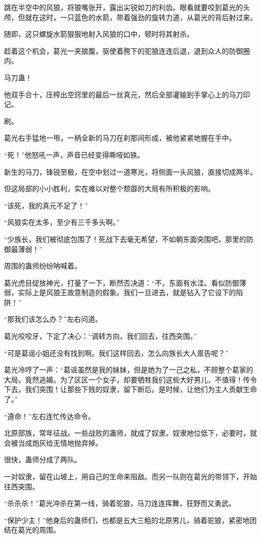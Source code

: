 \begin{this_body}
跳在半空中的风狼，将狼嘴张开，露出尖锐如刀的利齿。眼看就要咬到葛光的头颅，但就在这时，一只蓝色的水箭，带着强劲的旋转力道，从葛光的背后射过来。

随即，这只螺旋水箭狠狠地射入风狼的口中，顿时将其射杀。

趁着这个机会，葛光一夹狼腹，驱使着胯下的驼狼连连后退，退到众人的防御圈内。

马刀蛊！

他双手合十，压榨出空窍里的最后一丝真元，然后全部灌输到手掌心上的马刀印记。

刷。

葛光右手猛地一甩，一柄全新的马刀在刹那间形成，被他紧紧地握在手中。

“死！”他怒吼一声，声音已经变得嘶哑如铁。

新生的马刀，锋锐至极，在空中划过一道寒光，将侧面一头风狼，直接切成两半。

但这局部的小小胜利，实在难以对整个颓靡的大局有所积极的影响。

“该死，我的真元不足了！”

“风狼实在太多，至少有三千多头啊。”

“少族长，我们被彻底包围了！死战下去毫无希望，不如朝东面突围吧，那里的防御最薄弱！”

周围的蛊师纷纷呐喊着。

葛光虎目绽放神光，打量了一下，断然否决道：“不，东面有水洼。看似防御薄弱，实际上是风狼王故意制造的假象。我们一旦进去，就是钻入了它设下的陷阱！”

“那我们该怎么办？”左右问道。

葛光咬咬牙，下定了决心：“调转方向，我们回去，往西突围。”

“可是葛谣小姐还没有找到啊。我们这样回去，怎么向族长大人禀告呢？”

葛光冷哼了一声：“葛谣虽然是我的妹妹，但是她为了一己之私，不顾整个葛家的大局，竟然逃婚。为了区区一个女子，却要牺牲我们这些大好男儿，不值得！传令下去，我们突围！让那些下贱的奴隶，留下断后。是时候，让他们为主人贡献生命了。”

“遵命！”左右连忙传达命令。

北原部族，常年征战。一些战败的蛊师，就成了奴隶。奴隶地位低下，必要时，就会被当成炮灰给无情地抛弃掉。

很快，蛊师分成了两队。

一对奴隶，留在山坡上，用自己的生命来阻敌。而另一队则在葛光的带领下，开始往西突围。

“杀杀杀！”葛光冲杀在第一线，骑着驼狼，马刀连连挥舞，狂野而又勇武。

“保护少主！”他身后的蛊师们，也都是五大三粗的北原男儿，骑着驼狼，紧密地团结在葛光的周围。


\end{this_body}
